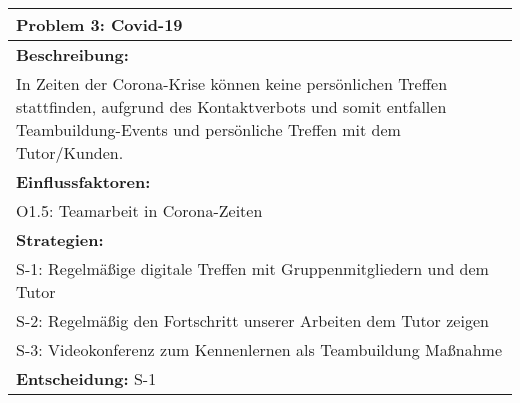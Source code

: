 \documentclass[fontsize=12pt,paper=a4,twoside]{scrartcl}
\begin{document}
\begin{longtable}{|p{15cm}|}
\hline
Problem 3: Covid-19                                                                           
\\ \hline                                                                                                                                                                                                                                                                                                                                                                                                                                                                                                                                                        
\textbf{Beschreibung:} \\
In Zeiten der Corona-Krise können keine persönlichen Treffen stattfinden, aufgrund des Kontaktverbots
und somit entfallen Teambuildung-Events und persönliche Treffen mit dem Tutor/Kunden.
\\ \hline
\textbf{Einflussfaktoren:} \\
O1.5: Teamarbeit in Corona-Zeiten
\\ \hline
\textbf{Strategien:} \\
S-1: Regelmäßige digitale Treffen mit Gruppenmitgliedern und dem Tutor\\
S-2: Regelmäßig den Fortschritt unserer Arbeiten dem Tutor zeigen \\
S-3: Videokonferenz zum Kennenlernen als Teambuildung Maßnahme
 \\ \hline
 \textbf{Entscheidung:} S-1
\\ \hline
\end{longtable}
\end{document}
